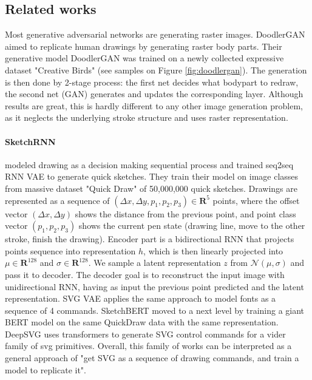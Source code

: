 \documentclass{article}
\begin{document}
	\subsection{Related works}
	
	Most generative adversarial networks are generating raster images. DoodlerGAN \cite{doodlergan} aimed to replicate human drawings by generating raster body parts. Their generative model DoodlerGAN was trained on a newly collected expressive dataset "Creative Birds" (see samples on Figure \ref{fig:doodlergan}). The generation is then done by 2-stage process: the first net decides what bodypart to redraw, the second net (GAN) generates and updates the corresponding layer. Although results are great, this is hardly different to any other image generation problem, as it neglects the underlying stroke structure and uses raster representation.
	
	\paragraph{SketchRNN} \cite{sketchrnn} modeled drawing as a decision making sequential process and trained seq2seq RNN VAE to generate quick sketches. They train their model on image classes from massive dataset "Quick Draw" of 50,000,000 quick sketches. Drawings are represented as a sequence of $(\Delta x, \Delta y, p_1, p_2, p_3) \in \mathbf{R}^5$ points, where the offset vector $(\Delta x, \Delta y)$ shows the distance from the previous point, and point class vector $(p_1, p_2, p_3)$ shows the current pen state (drawing line, move to the other stroke, finish the drawing). Encoder part is a bidirectional RNN that projects points sequence into representation $h$, which is then linearly projected into $\mu \in \mathbf{R}^{128}$ and $\sigma \in \mathbf{R}^{128}$. We sample a latent representation $z$ from $\mathcal N(\mu, \sigma)$ and pass it to decoder. The decoder goal is to reconstruct the input image with unidirectional RNN, having as input the previous point predicted and the latent representation. SVG VAE \cite{svgvae} applies the same approach to model fonts as a sequence of 4 commands. SketchBERT \cite{sketchbert} moved to a next level by training a giant BERT model on the same QuickDraw data with the same representation. DeepSVG \cite{carlier2020deepsvg} uses transformers to generate SVG control commands for a vider family of svg primitives. Overall, this family of works can be interpreted as a general approach of "get SVG as a sequence of drawing commands, and train a model to replicate it".
	
\end{document}

